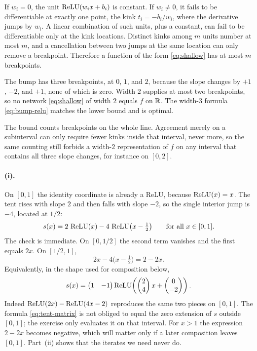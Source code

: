
If \(w_i=0\), the unit \(\operatorname{ReLU}(w_i x+b_i)\) is constant. If \(w_i\neq 0\), it fails to be differentiable at exactly one point, the kink \(t_i=-b_i/w_i\), where the derivative jumps by \(w_i\). A linear combination of such units, plus a constant, can fail to be differentiable only at the kink locations. Distinct kinks among \(m\) units number at most \(m\), and a cancellation between two jumps at the same location can only remove a breakpoint. Therefore a function of the form \eqref{eq:shallow} has at most \(m\) breakpoints.

The bump has three breakpoints, at \(0\), \(1\), and \(2\), because the slope changes by \(+1\), \(-2\), and \(+1\), none of which is zero. Width \(2\) supplies at most two breakpoints, so no network \eqref{eq:shallow} of width \(2\) equals \(f\) on \(\mathbb{R}\). The width-\(3\) formula \eqref{eq:bump-relu} matches the lower bound and is optimal.

The bound counts breakpoints on the whole line. Agreement merely on a subinterval can only require fewer kinks inside that interval, never more, so the same counting still forbids a width-\(2\) representation of \(f\) on any interval that contains all three slope changes, for instance on \([0,2]\).


\paragraph{(i).}
On \([0,1]\) the identity coordinate is already a ReLU, because \(\operatorname{ReLU}(x)=x\). The tent rises with slope \(2\) and then falls with slope \(-2\), so the single interior jump is \(-4\), located at \(1/2\):
\begin{equation}
  s(x) = 2\,\operatorname{ReLU}(x) - 4\,\operatorname{ReLU}\bigl(x-\tfrac12\bigr)
  \qquad\text{for all } x\in[0,1].
  \label{eq:tent-relu}
\end{equation}
The check is immediate. On \([0,1/2]\) the second term vanishes and the first equals \(2x\). On \([1/2,1]\),
\[
  2x - 4\bigl(x-\tfrac12\bigr) = 2-2x.
\]
Equivalently, in the shape used for composition below,
\begin{equation}
  s(x)
  =
  \begin{pmatrix} 1 & -1 \end{pmatrix}
  \operatorname{ReLU}\!\left(
    \begin{pmatrix} 2 \\ 4 \end{pmatrix} x
    +
    \begin{pmatrix} 0 \\ -2 \end{pmatrix}
  \right).
  \label{eq:tent-matrix}
\end{equation}
Indeed \(\operatorname{ReLU}(2x)-\operatorname{ReLU}(4x-2)\) reproduces the same two pieces on \([0,1]\). The formula \eqref{eq:tent-matrix} is not obliged to equal the zero extension of \(s\) outside \([0,1]\); the exercise only evaluates it on that interval. For \(x>1\) the expression \(2-2x\) becomes negative, which will matter only if a later composition leaves \([0,1]\). Part~(ii) shows that the iterates we need never do.

